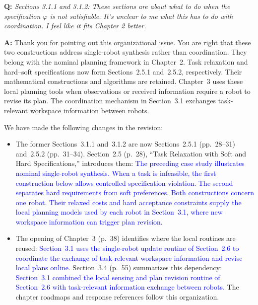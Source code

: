 \documentclass[11pt]{article}
\newcommand{\change}[1]{\textcolor{blue}{#1}}
\begin{document}
\begin{shaded*}
\noindent\textbf{Q:} \emph{Sections 3.1.1 and 3.1.2: These sections are
about what to do when the specification $\varphi$ is not satisfiable. It's unclear to me
what this has to do with coordination. I feel like it fits Chapter 2 better.}
\end{shaded*}
\noindent\textbf{A:} Thank you for pointing out this organizational issue.
You are right that these two constructions address single-robot synthesis
rather than coordination. They belong with the nominal planning framework
in Chapter~2. Task relaxation and hard--soft specifications now form
Sections~2.5.1 and~2.5.2, respectively. Their mathematical constructions
and algorithms are retained. Chapter~3 uses these local planning tools
when observations or received information require a robot to revise its
plan. The coordination mechanism in Section~3.1 exchanges task-relevant
workspace information between robots.

We have made the following changes in the revision:
\begin{itemize}
\item The former Sections~3.1.1 and~3.1.2 are now Sections~2.5.1
(pp.~28--31) and~2.5.2 (pp.~31--34). Section~2.5 (p.~28),
``Task Relaxation with Soft and Hard Specifications,'' introduces them:
\change{The preceding case study illustrates nominal single-robot synthesis.
When a task is infeasible, the first construction below allows controlled
specification violation. The second separates hard requirements from soft
preferences. Both constructions concern one robot. Their relaxed costs and
hard acceptance constraints supply the local planning models used by each
robot in Section~3.1, where new workspace information
can trigger plan revision.}

\item The opening of Chapter~3 (p.~38) identifies where the local routines
are reused:
\change{Section~3.1 uses the single-robot
update routine of Section~2.6 to coordinate the exchange
of task-relevant workspace information and revise local plans online.}
Section~3.4 (p.~55) summarizes this dependency:
\change{Section~3.1 combined the local
sensing and plan revision routine of Section~2.6 with
task-relevant information exchange between robots.}
The chapter roadmaps and response references follow this organization.
\end{itemize}
\end{document}
